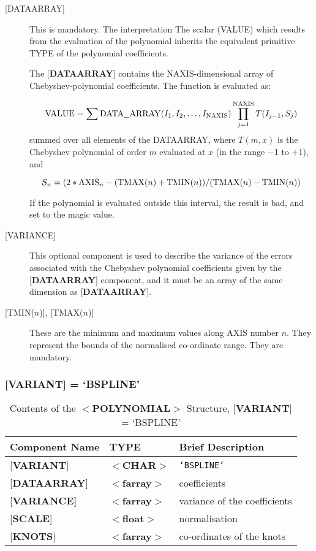 \documentclass[twoside,11pt]{article}
\renewcommand{\_}{\texttt{\symbol{95}}}
\begin{document}
\begin{description}

\item [{[}DATA\_ARRAY{]}] This is mandatory.  The interpretation The
scalar (VALUE) which results from the evaluation of the polynomial
inherits the equivalent primitive TYPE of the polynomial coefficients.

The {[}{\bf DATA\_ARRAY}{]} contains the NAXIS-dimensional
array of Chebyshev-polynomial coefficients.  The function is evaluated as:

\[{\rm VALUE}=\sum {\rm DATA\underline{~~}ARRAY}(I_1,I_2,\ldots,I_{\rm NAXIS})\prod_{j=1}^{\rm NAXIS} T(I_{j-1},S_j) \]
summed over all elements of the DATA\_ARRAY, where $T(m,x)$ is the
Chebyshev polynomial of order $m$ evaluated at $x$ (in the range $-$1
to $+$1), and

\[ S_n = ( 2 * {\rm AXIS}_n - ( {\rm TMAX}(n) + {\rm TMIN}(n))/({\rm TMAX}(n) - {\rm TMIN}(n)) \]


If the polynomial is evaluated outside this interval, the result is bad, and set
to the magic value.

\item [{[}VARIANCE{]}]  This optional component is used to describe the
variance of the errors associated with the Chebyshev polynomial coefficients
given by the {[}{\bf DATA\_ARRAY}{]} component, and it must be an
array of the same dimension as {[}{\bf DATA\_ARRAY}{]}.

\item [{[}TMIN{\rm ($n$)}{]}, {[}TMAX{\rm ($n$)}{]}]
These are the minimum and maximum values along AXIS number $n$.  They
represent the bounds of the normalised co-ordinate range.  They
are mandatory.

\end{description}


\subsubsection{{[}{\bf VARIANT}{]} = `BSPLINE'}

\begin{table}[hbt]
\centering
\caption{Contents of the $<${\bf POLYNOMIAL}$>$ Structure,
               {[}{\bf VARIANT}{]} = `BSPLINE'}
\begin{tabular}{|l|l|l|}
\hline
Component Name & TYPE & Brief Description \\ \hline
{[}{\bf VARIANT}{]} & $<${\bf \_CHAR}$>$ & {\tt `BSPLINE'} \\
{[}{\bf DATA\_ARRAY}{]} & $<${\bf farray}$>$ & coefficients \\
{[}{\bf VARIANCE}{]}  & $<${\bf farray}$>$ & variance of the coefficients \\
{[}{\bf SCALE}{]}  & $<${\bf float}$>$ & normalisation \\
{[}{\bf KNOTS}{]}  & $<${\bf farray}$>$ & co-ordinates of the knots \\ \hline
\end{tabular}
\end{table}
\end{document}
